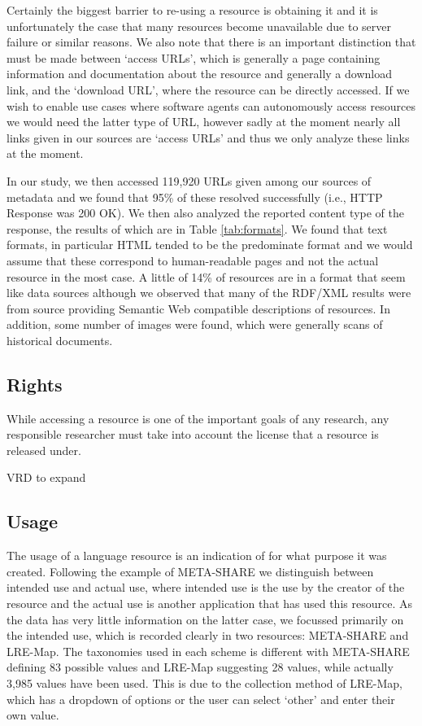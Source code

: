 \documentclass[smallextended]{svjour3}       %
\begin{document}
Certainly the biggest barrier to re-using a resource is obtaining it and it is
unfortunately the case that many resources become unavailable due to server
failure or similar reasons. We also note that there is an important distinction
that must be made between `access URLs', which is generally a page containing
information and documentation about the resource and generally a download link,
and the `download URL', where the resource can be directly accessed. If we wish
to enable use cases where software agents can autonomously access resources we
would need the latter type of URL, however sadly at the moment nearly all links
given in our sources are `access URLs' and thus we only analyze these links at
the moment.

In our study, we then accessed 119,920 URLs given among our sources of metadata
and we found that 95\% of these resolved successfully (i.e., HTTP Response was
200 OK). We then also analyzed the reported content type of the response, the
results of which are in Table \ref{tab:formats}. We found that text formats, in
particular HTML tended to be the predominate format and we would assume that
these correspond to human-readable pages and not the actual resource in the most
case. A little of 14\% of resources are in a format that seem like data sources
although we observed that many of the RDF/XML results were from source providing
Semantic Web compatible descriptions of resources. In addition, some number of
images were found, which were generally scans of historical documents.

\subsection{Rights}

While accessing a resource is one of the important goals of any research, any
responsible researcher must take into account the license that a resource is
released under. 

VRD to expand

\subsection{Usage}

The usage of a language resource is an indication of for what purpose it was
created. Following the example of META-SHARE we distinguish between intended use
and actual use, where intended use is the use by the creator of the resource and
the actual use is another application that has used this resource. As the data
has very little information on the latter case, we focussed primarily on the
intended use, which is recorded clearly in two resources: META-SHARE and
LRE-Map. The taxonomies used in each scheme is different with META-SHARE
defining 83 possible values and LRE-Map suggesting 28 values, while actually
3,985 values have been used. This is due to the collection method of LRE-Map,
which has a dropdown of options or the user can select `other' and enter their
own value. 
\end{document}
